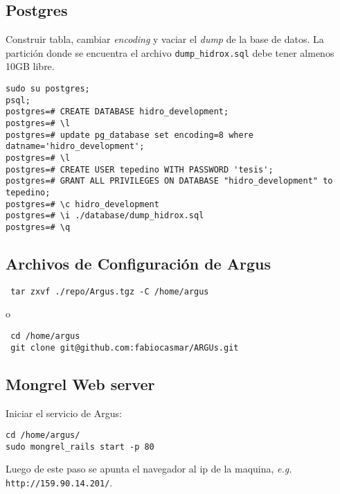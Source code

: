 \documentclass[spanish,10pt]{article}
\begin{document}
\subsection{Postgres}
Construir tabla, cambiar \emph{encoding} y vaciar el \emph{dump} de la base de datos. La partición donde se encuentra el archivo 
\verb+dump_hidrox.sql+ debe tener almenos 10GB libre.
\begin{verbatim}
sudo su postgres; 
psql;
postgres=# CREATE DATABASE hidro_development;
postgres=# \l
postgres=# update pg_database set encoding=8 where datname='hidro_development';
postgres=# \l
postgres=# CREATE USER tepedino WITH PASSWORD 'tesis';
postgres=# GRANT ALL PRIVILEGES ON DATABASE "hidro_development" to tepedino;
postgres=# \c hidro_development
postgres=# \i ./database/dump_hidrox.sql
postgres=# \q
\end{verbatim}
\subsection{Archivos de Configuración de Argus}
\begin{verbatim}
 tar zxvf ./repo/Argus.tgz -C /home/argus
\end{verbatim}
o
\begin{verbatim}
 cd /home/argus
 git clone git@github.com:fabiocasmar/ARGUs.git
\end{verbatim}
\subsection{Mongrel Web server}
Iniciar el servicio de Argus: 
\begin{verbatim}
cd /home/argus/
sudo mongrel_rails start -p 80
\end{verbatim}
Luego de este paso se apunta el navegador al ip de la maquina, \emph{e.g.} \texttt{http://159.90.14.201/}.
\end{document}
